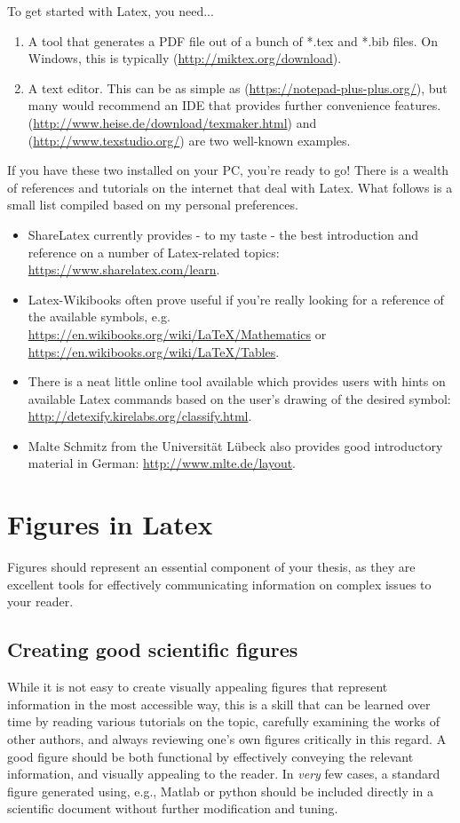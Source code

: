 To get started with Latex, you need...
\begin{enumerate}
\item A tool that generates a PDF file out of a bunch of *.tex and *.bib files.
On Windows, this is typically  (\url{http://miktex.org/download}).
\item A text editor. This can be as simple as  (\url{https://notepad-plus-plus.org/}), but many would recommend an IDE that provides further convenience features.  (\url{http://www.heise.de/download/texmaker.html}) and  (\url{http://www.texstudio.org/}) are two well-known examples.
\end{enumerate}
If you have these two installed on your PC, you're ready to go!
There is a wealth of references and tutorials on the internet that deal with Latex.
What follows is a small list compiled based on my personal preferences.
\begin{itemize}
\item ShareLatex currently provides - to my taste - the best introduction and reference on a number of Latex-related topics: \url{https://www.sharelatex.com/learn}.
\item Latex-Wikibooks often prove useful if you're really looking for a reference of the available symbols, e.g. \url{https://en.wikibooks.org/wiki/LaTeX/Mathematics} or \url{https://en.wikibooks.org/wiki/LaTeX/Tables}.
\item There is a neat little online tool available which provides users with hints on available Latex commands based on the user's drawing of the desired symbol: \url{http://detexify.kirelabs.org/classify.html}.
\item Malte Schmitz from the Universität Lübeck also provides good introductory material in German: \url{http://www.mlte.de/layout}.
\end{itemize}


\section{Figures in Latex}
Figures should represent an essential component of your thesis, as they are excellent tools for effectively communicating information on complex issues to your reader.

\subsection{Creating good scientific figures}
While it is not easy to create visually appealing figures that represent information in the most accessible way, this is a skill that can be learned over time by reading various tutorials on the topic, carefully examining the works of other authors, and always reviewing one's own figures critically in this regard.
A good figure should be both functional by effectively conveying the relevant information, and visually appealing to the reader.
In \emph{very} few cases, a standard figure generated using, e.g., Matlab or python should be included directly in a scientific document without further modification and \glqq tuning\grqq.

